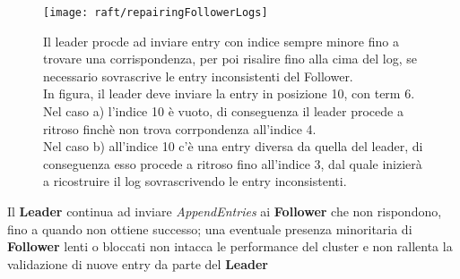 \begin{figure}[H]
	\centering
	\texttt{[image: raft/repairingFollowerLogs]}
	\caption{Il leader procde ad inviare entry con indice sempre minore fino a trovare una corrispondenza, per poi risalire fino alla cima del log, se necessario sovrascrive le entry inconsistenti del Follower.
	\\
	In figura, il leader deve inviare la entry in posizione 10, con term 6.
	\\
	Nel caso a) l'indice 10 è vuoto, di conseguenza il leader procede a ritroso finchè non trova corrpondenza all'indice 4.
	\\
	Nel caso b) all'indice 10 c'è una entry diversa da quella del leader, di conseguenza esso procede a ritroso fino all'indice 3, dal quale inizierà a ricostruire il log sovrascrivendo le entry inconsistenti.
}
	\label{fig:figure7}
\end{figure}


Il \textbf{Leader} continua ad inviare \textit{AppendEntries} ai \textbf{Follower} che non rispondono, fino a quando non ottiene successo; una eventuale presenza minoritaria di \textbf{Follower} lenti o bloccati non intacca le performance del cluster e non rallenta la validazione di nuove entry da parte del \textbf{Leader}
